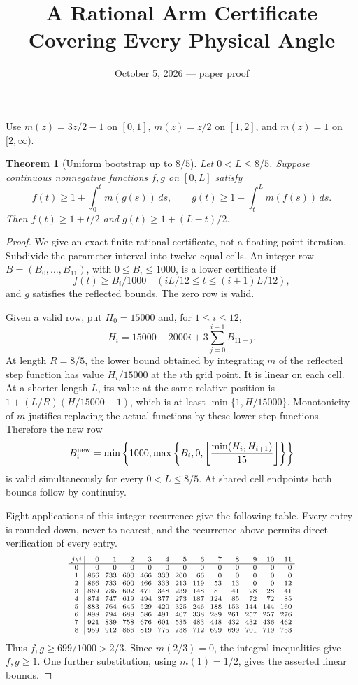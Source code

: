 \documentclass[11pt]{article}
\title{A Rational Arm Certificate Covering Every Physical Angle}
\author{}\date{October 5, 2026 --- paper proof}
\newtheorem{theorem}{Theorem}
\begin{document}
\maketitle
Use $m(z)=3z/2-1$ on $[0,1]$, $m(z)=z/2$ on $[1,2]$, and $m(z)=1$ on $[2,\infty)$.

\begin{theorem}[Uniform bootstrap up to $8/5$]
Let $0<L\le8/5$. Suppose continuous nonnegative functions $f,g$ on $[0,L]$ satisfy
\[
 f(t)\ge1+\int_0^t m(g(s))\,ds,\qquad
 g(t)\ge1+\int_t^L m(f(s))\,ds.
\]
Then $f(t)\ge1+t/2$ and $g(t)\ge1+(L-t)/2$.
\end{theorem}
\begin{proof}
We give an exact finite rational certificate, not a floating-point iteration. Subdivide the parameter interval into twelve equal cells. An integer row $B=(B_0,\ldots,B_{11})$, with $0\le B_i\le1000$, is a lower certificate if
\[
 f(t)\ge B_i/1000\quad(iL/12\le t\le(i+1)L/12),
\]
and $g$ satisfies the reflected bounds. The zero row is valid.

Given a valid row, put $H_0=15000$ and, for $1\le i\le12$,
\[
 H_i=15000-2000i+3\sum_{j=0}^{i-1}B_{11-j}.
\]
At length $R=8/5$, the lower bound obtained by integrating $m$ of the reflected step function has value $H_i/15000$ at the $i$th grid point. It is linear on each cell. At a shorter length $L$, its value at the same relative position is $1+(L/R)(H/15000-1)$, which is at least $\min\{1,H/15000\}$. Monotonicity of $m$ justifies replacing the actual functions by these lower step functions. Therefore the new row
\[
 B_i^{\rm new}=\min\left\{1000,\max\left\{B_i,0,
 \left\lfloor\frac{\min(H_i,H_{i+1})}{15}\right\rfloor\right\}\right\}
\]
is valid simultaneously for every $0<L\le8/5$. At shared cell endpoints both bounds follow by continuity.

Eight applications of this integer recurrence give the following table. Every entry is rounded down, never to nearest, and the recurrence above permits direct verification of every entry.
\[
\setlength{\arraycolsep}{3pt}\scriptsize
\begin{array}{c|rrrrrrrrrrrr}
 j\backslash i&0&1&2&3&4&5&6&7&8&9&10&11\\\hline
0&0&0&0&0&0&0&0&0&0&0&0&0\\
1&866&733&600&466&333&200&66&0&0&0&0&0\\
2&866&733&600&466&333&213&119&53&13&0&0&12\\
3&869&735&602&471&348&239&148&81&41&28&28&41\\
4&874&747&619&494&377&273&187&124&85&72&72&85\\
5&883&764&645&529&420&325&246&188&153&144&144&160\\
6&898&794&689&586&491&407&338&289&261&257&257&276\\
7&921&839&758&676&601&535&483&448&432&432&436&462\\
8&959&912&866&819&775&738&712&699&699&701&719&753
\end{array}
\]
Thus $f,g\ge699/1000>2/3$. Since $m(2/3)=0$, the integral inequalities give $f,g\ge1$. One further substitution, using $m(1)=1/2$, gives the asserted linear bounds.
\end{proof}
\end{document}

